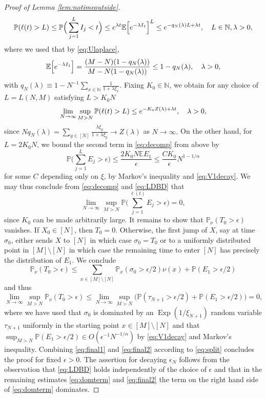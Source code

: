 \documentclass[11pt,a4paper]{scrartcl}
\numberwithin{equation}{section}
\theoremstyle{plain}
\theoremstyle{definition}
\theoremstyle{remark}
\newcommand{\bE}{\ensuremath{\mathbb{E}}}
\newcommand{\bN}{\ensuremath{\mathbb{N}}}
\newcommand{\bP}{\ensuremath{\mathbb{P}}}
\begin{document}
\begin{proof}[Proof of Lemma \ref{lem:notimeoutside}]
$$
\bP(\ell(t)>L)\leq \bP\Big(\sum_{j=1}^L I_j<t\Big)\leq \textup{e}^{\lambda t}\bE\Big[\textup{e}^{-\lambda I_1} \Big]^L\leq \textup{e}^{-q_N(\lambda)L+\lambda t},\quad L\in\bN, \lambda>0,
$$
where we used that by \eqref{eq:Ulaplace}, 
\begin{equation}\label{eq:weakbd}
\bE\Big[\textup{e}^{-\lambda I_1} \Big] = \frac{(M-N)(1-q_N(\lambda))}{M-N(1-q_N(\lambda))}\leq 1-{q_N(\lambda)}, \quad \lambda>0,
\end{equation}
with $q_N(\lambda)\equiv1-N^{-1}\sum_{x\in\bN}\frac{1 
}{1+\lambda \xi_x}$. 
Fixing $K_0\in\bN$, we obtain for any choice of $L=L(N,M)$ satisfying $L>K_0 N$
\begin{equation}\label{eq:LDBD}
\lim_{N\to\infty}\sup_{M>N}\bP(\ell(t)>L)\leq \textup{e}^{-K_0 Z(\lambda)+\lambda t}, \quad \lambda >0,
\end{equation}
since $N q_N(\lambda)=\sum_{y\in[N]}\frac{\lambda \xi_y}{1+\lambda \xi_y}\to Z(\lambda)$ as $N\to\infty.$ On the other hand, for $L=2K_0N$, we bound the second term in \eqref{eq:decomp} from above by
\begin{equation}\label{eq:domterm}
\bP\Big( \sum_{j=1}^{L}E_j >\epsilon \Big)\leq \frac{2K_0N \bE E_1}{\epsilon}\leq \frac{C K_0}{\epsilon}N^{1-1/\alpha}
\end{equation}
for some $C$ depending only on $\xi$, by Markov's inequality and \eqref{eq:V1decay}. We may thus conclude from \eqref{eq:decomp} and \eqref{eq:LDBD} that
\begin{equation}\label{eq:final1}
\lim_{N\to\infty}\sup_{M>N}\bP\Big( \sum_{j=1}^{\ell(t)}E_j >\epsilon \Big)=0,
\end{equation}
since $K_0$ can be made arbitrarily large. It remains to show that $\bP_\nu(T_0>\epsilon)$ vanishes. If $X_0\in[N]$, then $T_0=0$. Otherwise, the first jump of $X$, say at time $\sigma_0$, either sends $X$ to $[N]$ in which case $\sigma_0=T_0$ or to a uniformly distributed point in $[M]\setminus[N]$ in which case the remaining time to enter $[N]$ has precisely the distribution of $E_1$. We conclude
$$
\bP_\nu(T_0>\epsilon)\leq \sum_{x\in[M]\setminus[N]}\bP_x(\sigma_0>\epsilon/2)\nu(x) +\bP(E_1>\epsilon/2)
$$
and thus 
\begin{equation}\label{eq:final2}
	\lim_{N\to\infty}\sup_{M>N}\bP_{\nu}(T_0>\epsilon)\leq \lim_{N\to\infty}\sup_{M>N} \big(\bP(\tau_{N+1}>\epsilon/2)+\bP(E_1>\epsilon/2)\big) = 0,
\end{equation}
where we have used that $\sigma_0$ is dominated by an $\operatorname{Exp}(1/\xi_{N+1})$ random variable $\tau_{N+1}$ uniformly in the starting point $x\in[M]\setminus[N]$ and that $\sup_{M>N}\bP(E_1>\epsilon/2)\in O(\epsilon^{-1}N^{-1/\alpha})$ by \eqref{eq:V1decay} and Markov's inequality. Combining \eqref{eq:final1} and \eqref{eq:final2} according to \eqref{eq:split} concludes the proof for fixed $\epsilon>0$. The assertion for decaying $\epsilon_N$ follows from the observation that \eqref{eq:LDBD} holds independently of the choice of $\epsilon$ and that in the remaining estimates \eqref{eq:domterm} and \eqref{eq:final2} the term on the right hand side of \eqref{eq:domterm} dominates. 
\end{proof}
\end{document}
